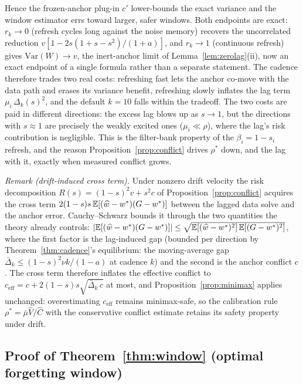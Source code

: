 Hence the frozen-anchor plug-in $c'$ lower-bounds the exact variance and the window estimator errs toward larger, safer windows.
Both endpoints are exact: $r_k \to 0$ (refresh cycles long against the noise memory) recovers the uncorrelated reduction $v[1 - 2s(1+s-s^2)/(1+a)]$, and $r_k \to 1$ (continuous refresh) gives $\mathrm{Var}(W) \to v$, the inert-anchor limit of Lemma~\ref{lem:zerolag}(ii), now an exact endpoint of a single formula rather than a separate statement.
The cadence therefore trades two real costs: refreshing fast lets the anchor co-move with the data path and erases its variance benefit, refreshing slowly inflates the lag term $\mu_i\,\Delta_k(s)^2$, and the default $k = 10$ falls within the tradeoff.
The two costs are paid in different directions: the excess lag blows up as $s \to 1$, but the directions with $s \approx 1$ are precisely the weakly excited ones ($\mu_i \ll \rho$), where the lag's risk contribution is negligible. This is the filter-bank property of the $\beta_i = 1 - s_i$ refresh, and the reason Proposition~\ref{prop:conflict} drives $\rho^*$ down, and the lag with it, exactly when measured conflict grows.

\medskip
\noindent\emph{Remark (drift-induced cross term).}
Under nonzero drift velocity the risk decomposition $R(s) = (1-s)^2 v + s^2 c$ of Proposition~\ref{prop:conflict} acquires the cross term $2(1-s)s\,\mathbb{E}[(\widehat w - w^*)(G - w^*)]$ between the lagged data solve and the anchor error.
Cauchy--Schwarz bounds it through the two quantities the theory already controls: $|\mathbb{E}[(\widehat w - w^*)(G - w^*)]| \le \sqrt{\mathbb{E}[(\widehat w - w^*)^2]\,\mathbb{E}[(G - w^*)^2]}$, where the first factor is the lag-induced gap (bounded per direction by Theorem~\ref{thm:cadence}'s equilibrium: the moving-average gap $\bar\Delta_k \le (1-s)^2\nu k/(1-a)$ at cadence $k$) and the second is the anchor conflict $c$.
The cross term therefore inflates the effective conflict to $c_{\mathrm{eff}} = c + 2(1-s)s\sqrt{\bar\Delta_k\,c}$ at most, and Proposition~\ref{prop:minimax} applies unchanged: overestimating $c_{\mathrm{eff}}$ remains minimax-safe, so the calibration rule $\rho^* = \bar\mu \widehat V / \widehat C$ with the conservative conflict estimate retains its safety property under drift.

\subsection{Proof of Theorem~\ref{thm:window} (optimal forgetting window)}
\label{app:proof-window}



